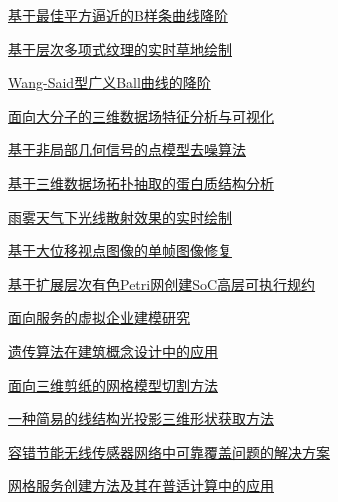 \documentclass[a4paper]{article}
\begin{document}
\href{http://www.jos.org.cn/ch/reader/download_pdf.aspx?file_no=2006s110&year_id=2006&quarter_id=zk&falg=1}{基于最佳平方逼近的B样条曲线降阶}

\href{http://www.jos.org.cn/ch/reader/download_pdf.aspx?file_no=2006s111&year_id=2006&quarter_id=zk&falg=1}{基于层次多项式纹理的实时草地绘制}

\href{http://www.jos.org.cn/ch/reader/download_pdf.aspx?file_no=2006s112&year_id=2006&quarter_id=zk&falg=1}{Wang-Said型广义Ball曲线的降阶}

\href{http://www.jos.org.cn/ch/reader/download_pdf.aspx?file_no=2006s113&year_id=2006&quarter_id=zk&falg=1}{面向大分子的三维数据场特征分析与可视化}

\href{http://www.jos.org.cn/ch/reader/download_pdf.aspx?file_no=2006s114&year_id=2006&quarter_id=zk&falg=1}{基于非局部几何信号的点模型去噪算法}

\href{http://www.jos.org.cn/ch/reader/download_pdf.aspx?file_no=2006s115&year_id=2006&quarter_id=zk&falg=1}{基于三维数据场拓扑抽取的蛋白质结构分析}

\href{http://www.jos.org.cn/ch/reader/download_pdf.aspx?file_no=2006s116&year_id=2006&quarter_id=zk&falg=1}{雨雾天气下光线散射效果的实时绘制}

\href{http://www.jos.org.cn/ch/reader/download_pdf.aspx?file_no=2006s117&year_id=2006&quarter_id=zk&falg=1}{基于大位移视点图像的单帧图像修复}

\href{http://www.jos.org.cn/ch/reader/download_pdf.aspx?file_no=2006s118&year_id=2006&quarter_id=zk&falg=1}{基于扩展层次有色Petri网创建SoC高层可执行规约}

\href{http://www.jos.org.cn/ch/reader/download_pdf.aspx?file_no=2006s119&year_id=2006&quarter_id=zk&falg=1}{面向服务的虚拟企业建模研究}

\href{http://www.jos.org.cn/ch/reader/download_pdf.aspx?file_no=2006s120&year_id=2006&quarter_id=zk&falg=1}{遗传算法在建筑概念设计中的应用}

\href{http://www.jos.org.cn/ch/reader/download_pdf.aspx?file_no=2006s121&year_id=2006&quarter_id=zk&falg=1}{面向三维剪纸的网格模型切割方法}

\href{http://www.jos.org.cn/ch/reader/download_pdf.aspx?file_no=2006s122&year_id=2006&quarter_id=zk&falg=1}{一种简易的线结构光投影三维形状获取方法}

\href{http://www.jos.org.cn/ch/reader/download_pdf.aspx?file_no=2006s123&year_id=2006&quarter_id=zk&falg=1}{容错节能无线传感器网络中可靠覆盖问题的解决方案}

\href{http://www.jos.org.cn/ch/reader/download_pdf.aspx?file_no=2006s124&year_id=2006&quarter_id=zk&falg=1}{网格服务创建方法及其在普适计算中的应用}
\end{document}
